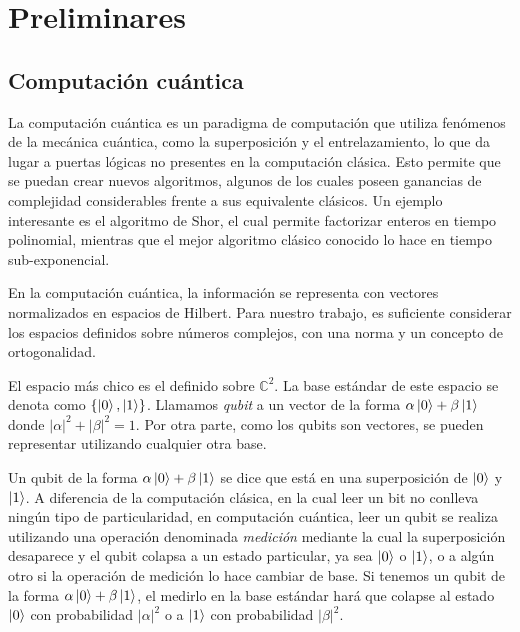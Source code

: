 \chapter{Preliminares}\label{Chapter2}

\section{Computación cuántica}

La computación cuántica es un paradigma de computación que utiliza fenómenos de la mecánica cuántica, como la superposición y el entrelazamiento, lo que da lugar a puertas lógicas no presentes en la computación clásica. Esto permite que se puedan crear nuevos algoritmos, algunos de los cuales poseen ganancias de complejidad considerables frente a sus equivalente clásicos. Un ejemplo interesante es el algoritmo de Shor, el cual permite factorizar enteros en tiempo polinomial, mientras que el mejor algoritmo clásico conocido lo hace en tiempo sub-exponencial.

En la computación cuántica, la información se representa con vectores normalizados en espacios de Hilbert. Para nuestro trabajo, es suficiente considerar los espacios definidos sobre números complejos, con una norma y un concepto de ortogonalidad.

El espacio más chico es el definido sobre \( \mathbb{C}^2 \). La base estándar de este espacio se denota como \( \{\ket{0}, \ket{1}\} \). Llamamos \textit{qubit} a un vector de la forma \( \alpha \ket{0} + \beta \ket{1} \) donde \( |\alpha|^2 + |\beta|^2 = 1 \). Por otra parte, como los qubits son vectores, se pueden representar utilizando cualquier otra base.

Un qubit de la forma \( \alpha \ket{0} + \beta \ket{1} \) se dice que está en una superposición de \( \ket{0} \) y \( \ket{1} \). A diferencia de la computación clásica, en la cual leer un bit no conlleva ningún tipo de particularidad, en computación cuántica, leer un qubit se realiza utilizando una operación denominada \textit{medición} mediante la cual la superposición desaparece y el qubit colapsa a un estado particular, ya sea \( \ket{0} \) o \( \ket{1} \), o a algún otro si la operación de medición lo hace cambiar de base.
Si tenemos un qubit de la forma \( \alpha \ket{0} + \beta \ket{1} \), el medirlo en la base estándar hará que colapse al estado \( \ket{0} \) con probabilidad \( |\alpha|^2 \) o a \( \ket{1} \) con probabilidad \( |\beta|^2 \).


